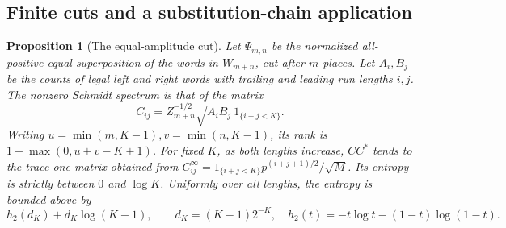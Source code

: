 \documentclass[11pt,reqno]{amsart}
\newtheorem{proposition}[theorem]{Proposition}
\theoremstyle{definition}
\theoremstyle{remark}
\numberwithin{equation}{section}
\begin{document}
\subsection{Finite cuts and a substitution-chain application}

\begin{proposition}[The equal-amplitude cut]\label{m9:cut}
Let \(\Psi_{m,n}\) be the normalized all-positive equal
superposition of the words in \(W_{m+n}\), cut after \(m\)
places. Let \(A_i,B_j\) be the counts of legal left and right
words with trailing and leading run lengths \(i,j\).
The nonzero Schmidt spectrum is that of the matrix
\[
 C_{ij}=Z_{m+n}^{-1/2}\sqrt{A_i B_j}\,1_{\{i+j<K\}}.
\]
Writing \(u=\min(m,K-1),v=\min(n,K-1)\), its rank is
\(1+\max(0,u+v-K+1)\). For fixed \(K\), as both lengths
increase, \(CC^*\) tends to the trace-one matrix obtained
from \(C^\infty_{ij}=1_{\{i+j<K\}}p^{(i+j+1)/2}/\sqrt M\).
Its entropy is strictly between \(0\) and \(\log K\).
Uniformly over all lengths, the entropy is bounded above by
\[
 h_2(d_K)+d_K\log(K-1),\qquad d_K=(K-1)2^{-K},
 \quad h_2(t)=-t\log t-(1-t)\log(1-t).
\]
\end{proposition}
\end{document}
